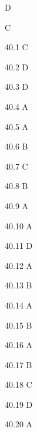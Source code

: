 \begin{Solution}{39}
D
\end{Solution}
\begin{Solution}{40}
C
\end{Solution}
\begin{Solution}{40.{1}}
C
\end{Solution}
\begin{Solution}{40.{2}}
D
\end{Solution}
\begin{Solution}{40.{3}}
D
\end{Solution}
\begin{Solution}{40.{4}}
A
\end{Solution}
\begin{Solution}{40.{5}}
A
\end{Solution}
\begin{Solution}{40.{6}}
B
\end{Solution}
\begin{Solution}{40.{7}}
C
\end{Solution}
\begin{Solution}{40.{8}}
B
\end{Solution}
\begin{Solution}{40.{9}}
A
\end{Solution}
\begin{Solution}{40.{10}}
A
\end{Solution}
\begin{Solution}{40.{11}}
D
\end{Solution}
\begin{Solution}{40.{12}}
A
\end{Solution}
\begin{Solution}{40.{13}}
B
\end{Solution}
\begin{Solution}{40.{14}}
A
\end{Solution}
\begin{Solution}{40.{15}}
B
\end{Solution}
\begin{Solution}{40.{16}}
A
\end{Solution}
\begin{Solution}{40.{17}}
B
\end{Solution}
\begin{Solution}{40.{18}}
C
\end{Solution}
\begin{Solution}{40.{19}}
D
\end{Solution}
\begin{Solution}{40.{20}}
A
\end{Solution}
